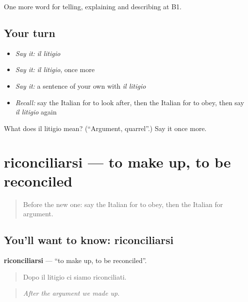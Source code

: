 \begin{grammarlens}[title={What you've built}]
One more word for telling, explaining and describing at B1.
\end{grammarlens}

\subsection*{Your turn}
\begin{itemize}
\raggedright
  \item \emph{Say it:} \emph{il litigio}
  \item \emph{Say it:} \emph{il litigio}, once more
  \item \emph{Say it:} a sentence of your own with \emph{il litigio}
  \item \emph{Recall:} say the Italian for to look after, then the Italian for to obey, then say \emph{il litigio} again
\end{itemize}

\begin{tcolorbox}[breakable,colback=teal!4,colframe=teal!35!black,title={Before you move on}]
What does il litigio mean? (\textquotedblleft{}Argument, quarrel\textquotedblright{}.) Say it once more.
\end{tcolorbox}
\section[riconciliarsi]{riconciliarsi — to make up, to be reconciled}

\label{lesson:IT-C499-riconciliarsi}



\begin{quote}
Before the new one: say the Italian for to obey, then the Italian for argument.
\end{quote}

\subsection*{You'll want to know: riconciliarsi}
\textbf{riconciliarsi} — \textquotedblleft{}to make up, to be reconciled\textquotedblright{}.

\begin{quote}
Dopo il litigio ci siamo riconciliati.
\end{quote}

\begin{quote}
\emph{After the argument we made up.}
\end{quote}

